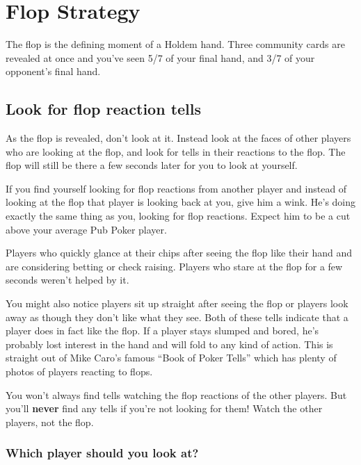 \chapter{Flop Strategy}


The flop is the defining moment of a Holdem hand. Three community
cards are revealed at once and you've seen 5/7 of your final hand,
and 3/7 of your opponent's final hand.

\section{Look for flop reaction tells}

As the flop is revealed, don't look at it. Instead look
at the faces of other players who are looking
at the flop, and look for tells in their reactions to the flop.
The flop will still be there a few seconds later for you to look at
yourself.

If you find yourself looking for flop reactions from another player
and instead of looking at the flop that player is looking back at you,
give him a wink. He's doing exactly the same thing as you, looking for flop
reactions. Expect him to be a cut above your average Pub Poker player.

Players who quickly glance at their chips after seeing the flop
like their hand and are considering betting or check raising.
Players who stare at the flop for a few seconds weren't helped by it.

You might also notice players sit up straight after seeing the flop
or players look away as though they don't like what they see. Both
of these tells indicate that a player does in fact like the flop.
If a player stays slumped and bored, he's probably lost interest
in the hand and will fold to any kind of action. This is straight
out of Mike Caro's famous ``Book of Poker Tells'' which has plenty
of photos of players reacting to flops.


You won't always find tells watching the flop reactions of the other
players. But you'll \textbf{never} find any tells if you're not
looking for them! Watch the other players, not the flop.

\subsection{Which player should you look at?}

